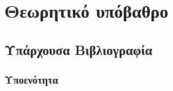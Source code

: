 \documentclass[../main.tex]{subfiles}
\begin{document}
    

\section{Θεωρητικό υπόβαθρο}

\subsection{Υπάρχουσα Βιβλιογραφία}
\subsubsection{Υποενότητα}
\clearpage
\end{document}
